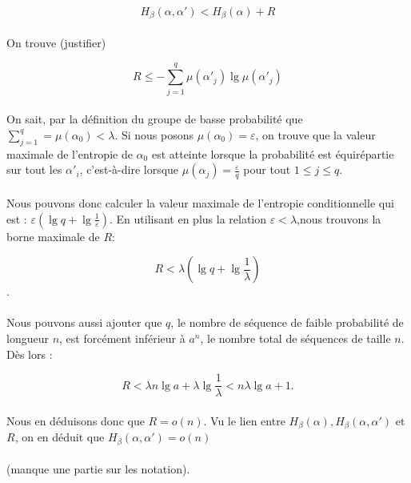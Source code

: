 	\[H_\beta(\alpha,\alpha') < H_\beta(\alpha) + R\]
	
	\paragraph{}
	On trouve (justifier)
	
	\[R \le -\sum_{j=1}^q\mu(\alpha'_j)\lg\mu(\alpha'_j)\]
	
	\paragraph{}
	On sait, par la définition du groupe de basse probabilité que 
	$\sum_{j=1}^q =\mu(\alpha_0) < \lambda$. Si nous posons 
	$\mu(\alpha_0)=\varepsilon$, on trouve que la valeur maximale 
	de l'entropie de $\alpha_0$ est atteinte lorsque la probabilité 
	est équirépartie sur tout les $\alpha'_i$, c'est-à-dire lorsque
	 $\mu(\alpha_j)=\frac{\varepsilon}{q}$ pour tout $1\le j\le q$.
	
	\paragraph{}
	Nous pouvons donc calculer la valeur maximale de l'entropie conditionnelle
	qui est : $\varepsilon \left(\lg q+\lg\frac{1}{\varepsilon}\right)$.
	En utilisant en plus la relation $\varepsilon < \lambda$,nous trouvons la
	 borne maximale de $R$:
	
	\[R<\lambda\left(\lg q+\lg\frac{1}{\lambda}\right)\].
	
	\paragraph{}
	Nous pouvons aussi ajouter que $q$, le nombre de séquence de faible 
	probabilité de longueur $n$, est forcément inférieur à $a^n$, le 
	nombre total de séquences de taille $n$.
	Dès lors :
	
	\[R<\lambda n\lg a +\lambda \lg \frac{1}{\lambda}<n\lambda\lg a+1.\]
	
	\paragraph{}
	Nous en déduisons donc que $R=o(n)$. Vu le lien entre 
	$H_\beta(\alpha),H_\beta(\alpha,\alpha')$ et $R$, 
	on en déduit que $H_\beta(\alpha,\alpha')=o(n)$
	
	\paragraph{}
	(manque une partie sur les notation).
	
